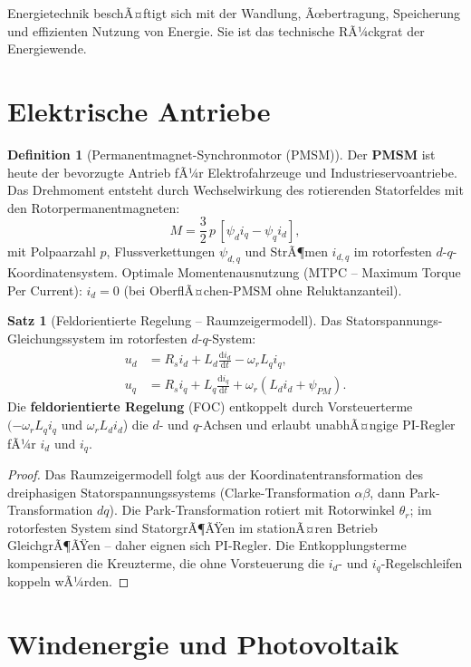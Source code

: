 ﻿\documentclass[a4paper,12pt]{report}
\theoremstyle{definition}
\newtheorem{definition}{Definition}
\newtheorem{satz}{Satz}
\begin{document}
Energietechnik beschÃ¤ftigt sich mit der Wandlung, Ãœbertragung,
Speicherung und effizienten Nutzung von Energie. Sie ist das
technische RÃ¼ckgrat der Energiewende.

\section{Elektrische Antriebe}

\begin{definition}[Permanentmagnet-Synchronmotor (PMSM)]
Der \textbf{PMSM} ist heute der bevorzugte Antrieb fÃ¼r Elektrofahrzeuge
und Industrieservoantriebe. Das Drehmoment entsteht durch Wechselwirkung
des rotierenden Statorfeldes mit den Rotorpermanentmagneten:
\[
  M = \frac{3}{2}\,p\,[\psi_d i_q - \psi_q i_d],
\]
mit Polpaarzahl $p$, Flussverkettungen $\psi_{d,q}$ und StrÃ¶men $i_{d,q}$
im rotorfesten $d$-$q$-Koordinatensystem.
Optimale Momentenausnutzung (MTPC -- Maximum Torque Per Current):
$i_d = 0$ (bei OberflÃ¤chen-PMSM ohne Reluktanzanteil).
\end{definition}

\begin{satz}[Feldorientierte Regelung -- Raumzeigermodell]
Das Statorspannungs-Gleichungssystem im rotorfesten $d$-$q$-System:
\begin{align*}
  u_d &= R_s i_d + L_d \frac{\mathrm{d}i_d}{\mathrm{d}t} - \omega_r L_q i_q, \\
  u_q &= R_s i_q + L_q \frac{\mathrm{d}i_q}{\mathrm{d}t} + \omega_r (L_d i_d + \psi_{PM}).
\end{align*}
Die \textbf{feldorientierte Regelung} (FOC) entkoppelt durch
Vorsteuerterme $(-\omega_r L_q i_q$ und $\omega_r L_d i_d$) die
$d$- und $q$-Achsen und erlaubt unabhÃ¤ngige PI-Regler fÃ¼r $i_d$ und $i_q$.
\end{satz}
\begin{proof}
Das Raumzeigermodell folgt aus der Koordinatentransformation des
dreiphasigen Statorspannungssystems (Clarke-Transformation $\alpha\beta$,
dann Park-Transformation $dq$). Die Park-Transformation rotiert
mit Rotorwinkel $\theta_r$; im rotorfesten System sind StatorgrÃ¶ÃŸen
im stationÃ¤ren Betrieb GleichgrÃ¶ÃŸen -- daher eignen sich PI-Regler.
Die Entkopplungsterme kompensieren die Kreuzterme, die ohne Vorsteuerung
die $i_d$- und $i_q$-Regelschleifen koppeln wÃ¼rden.
\end{proof}

\section{Windenergie und Photovoltaik}
\end{document}
